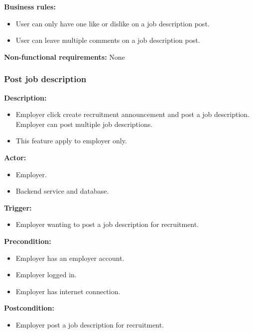 \documentclass[a4paper]{article}
\begin{document}
        \textbf{Business rules:}
        \begin{itemize}
            \item User can only have one like or dislike on a job description post.
            \item User can leave multiple comments on a job description post.
        \end{itemize}

        \textbf{Non-functional requirements:}
        None

        \subsubsection{Post job description}
        \textbf{Description:}
        \begin{itemize}
            \item Employer click create recruitment announcement and post a job description. Employer can post multiple job descriptions.
            \item This feature apply to employer only.
        \end{itemize}

        \textbf{Actor:}
        \begin{itemize}
            \item Employer.
            \item Backend service and database.
        \end{itemize}

        \textbf{Trigger:}
        \begin{itemize}
            \item Employer wanting to post a job description for recruitment.
        \end{itemize}

        \textbf{Precondition:}
        \begin{itemize}
            \item Employer has an employer account.
            \item Employer logged in.
            \item Employer has internet connection.
        \end{itemize}

        \textbf{Postcondition:}
        \begin{itemize}
            \item Employer post a job description for recruitment.
        \end{itemize}
\end{document}
